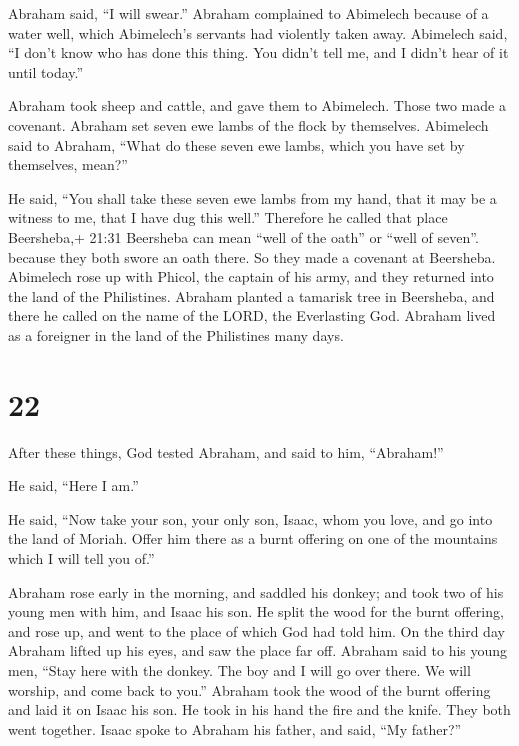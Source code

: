  Abraham said, ``I will swear.''  Abraham
complained to Abimelech because of a water well, which Abimelech's
servants had violently taken away.  Abimelech said, ``I
don't know who has done this thing. You didn't tell me, and I didn't
hear of it until today.''

 Abraham took sheep and cattle, and gave them to Abimelech.
Those two made a covenant.  Abraham set seven ewe lambs of
the flock by themselves.  Abimelech said to Abraham, ``What
do these seven ewe lambs, which you have set by themselves, mean?''

 He said, ``You shall take these seven ewe lambs from my
hand, that it may be a witness to me, that I have dug this well.''
 Therefore he called that place Beersheba,+ 21:31 Beersheba
can mean ``well of the oath'' or ``well of seven''. because they both
swore an oath there.  So they made a covenant at Beersheba.
Abimelech rose up with Phicol, the captain of his army, and they
returned into the land of the Philistines.  Abraham planted
a tamarisk tree in Beersheba, and there he called on the name of the
LORD, the Everlasting God.  Abraham lived as a foreigner in
the land of the Philistines many days.

\hypertarget{section-21}{%
\section{22}\label{section-21}}

 After these things, God tested Abraham, and said to him,
``Abraham!''

He said, ``Here I am.''

 He said, ``Now take your son, your only son, Isaac, whom
you love, and go into the land of Moriah. Offer him there as a burnt
offering on one of the mountains which I will tell you of.''

 Abraham rose early in the morning, and saddled his donkey;
and took two of his young men with him, and Isaac his son. He split the
wood for the burnt offering, and rose up, and went to the place of which
God had told him.  On the third day Abraham lifted up his
eyes, and saw the place far off.  Abraham said to his young
men, ``Stay here with the donkey. The boy and I will go over there. We
will worship, and come back to you.''  Abraham took the wood
of the burnt offering and laid it on Isaac his son. He took in his hand
the fire and the knife. They both went together.  Isaac
spoke to Abraham his father, and said, ``My father?''

